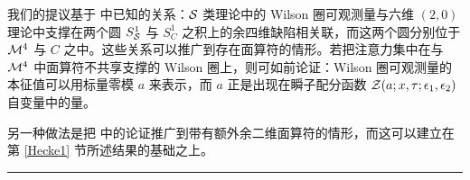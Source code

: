 我们的提议基于 {\crd \cite{DMO}} 中已知的关系：$\mathcal{S}$ 类理论中的 Wilson 圈可观测量与六维 $(2,0)$ 理论中支撑在两个圆 $S^1_{\mathcal{S}}$ 与 $S^1_C$ 之积上的余四维缺陷相关联，而这两个圆分别位于 $\mathcal{M}^4$ 与 $C$ 之中。这些关系可以推广到存在面算符的情形。若把注意力集中在与 $\mathcal{M}^4$ 中面算符不共享支撑的 Wilson 圈上，则可如前论证：Wilson 圈可观测量的本征值可以用标量零模 $a$ 来表示，而 $a$ 正是出现在瞬子配分函数 $\mathcal{Z}({ a;x},\tau;\epsilon_1,\epsilon_2)$ 自变量中的量。

另一种做法是把 \cite{AGGTV} 中的论证推广到带有额外余二维面算符的情形，而这可以建立在第 \ref{Hecke1} 节所述结果的基础之上。

\bigskip
\noindent\rule{\textwidth}{0.6pt}

